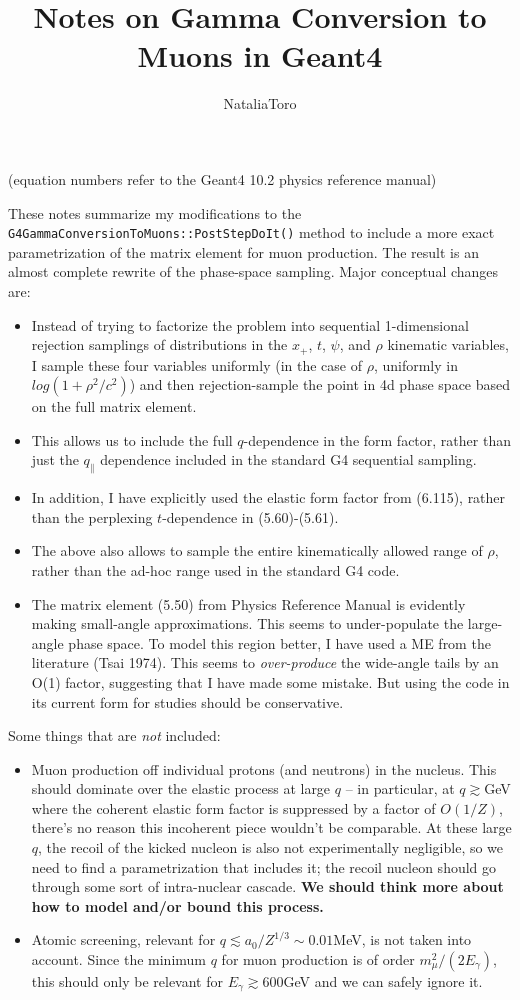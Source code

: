 \documentclass[11pt]{article}
\title{Notes on Gamma Conversion to Muons in Geant4}
\author{NataliaToro}
\date{}                               %
\begin{document}
\maketitle

(equation numbers refer to the Geant4 10.2 physics reference manual)

These notes summarize my modifications to the \verb=G4GammaConversionToMuons::PostStepDoIt()= method to include a more exact parametrization of the matrix element for muon production.  The result is an almost complete rewrite of the phase-space sampling.  Major  conceptual changes are:
\begin{itemize}
\item Instead of trying to factorize the problem into sequential 1-dimensional rejection samplings of distributions in the $x_+$, $t$, $\psi$, and $\rho$ kinematic variables, I sample these four variables uniformly (in the case of $\rho$, uniformly in $log(1+\rho^2/c^2)$) and then rejection-sample the point in 4d phase space based on the full matrix element. 
\item This allows us to include the full $q$-dependence in the form factor, rather than just the $q_\parallel$ dependence included in the standard G4 sequential sampling.
\item In addition, I have explicitly used the elastic form factor from (6.115), rather than the perplexing $t$-dependence in (5.60)-(5.61).  
\item The above also allows to sample the entire kinematically allowed range of $\rho$, rather than the ad-hoc range used in the standard G4 code.
\item The matrix element (5.50) from Physics Reference Manual is evidently making small-angle approximations.  This seems to under-populate the large-angle phase space.  To model this region better, I have used a ME from the literature (Tsai 1974).   This seems to \emph{over-produce} the wide-angle tails by an O(1) factor, suggesting that I have made some mistake.  But using the code in its current form for studies should be conservative. 
\end{itemize}
Some things that are \emph{not} included:
\begin{itemize}
\item Muon production off individual protons (and neutrons) in the nucleus.  This should dominate over the elastic process at large $q$ -- in particular, at $q\gtrsim $GeV where the coherent elastic form factor is suppressed by a factor of $O(1/Z)$, there's no reason this incoherent piece wouldn't be comparable.  At these large $q$, the recoil of the kicked nucleon is also not experimentally negligible, so we need to find a parametrization that includes it; the recoil nucleon should go through some sort of intra-nuclear cascade.  \textbf{We should think more about how to model and/or bound this process. }
\item Atomic screening, relevant for $q \lesssim a_0/Z^{1/3} \sim 0.01 $MeV, is not taken into account.  Since the minimum $q$ for muon production is of order $m_\mu^2/(2E_\gamma)$, this should only be relevant for $E_\gamma \gtrsim 600 $GeV and we can safely ignore it. 
\end{itemize}
\end{document}
